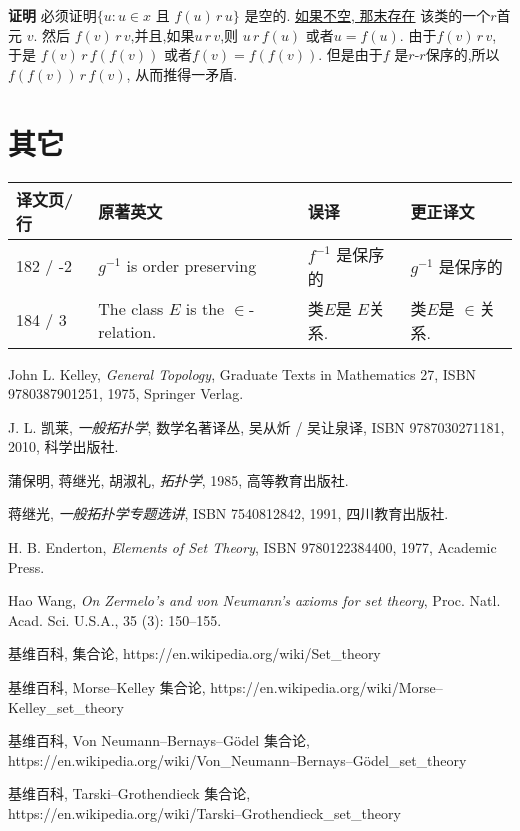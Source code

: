 \documentclass[zihao=-4,a4paper]{ctexart}
\begin{document}
{\bf 证明}
必须证明$\{u: u \in x $ 且 $ f(u) \, r\, u\}$ 是空的. 
\underline{如果不空, 那末存在}\! 该类的一个$r$首元 $v$.
然后 $f(v)\, r\, v $,并且,如果$u\, r\, v$,则 $u\, r\, f(u)$
或者$u = f(u)$.
由于$f(v)\, r\, v$, 于是
\underline{$f(v)\, r\, f(f(v))$}
或者$f(v)=f(f(v))$. 但是由于$f$ 是$r$-$r$保序的,所以
$f(f(v))\, r\, f(v)$, 从而推得一矛盾.


\section{其它}

\begin{tabular}{l l l l }
	\hline
	{\kaishu 译文页/行} & {\kaishu 原著英文} & {\kaishu 误译} & {\kaishu 更正译文} \\
	\hline
	182 / -2 & $g^{-1}$ is order preserving  & $f^{-1}$ 是保序的 & $g^{-1}$ 是保序的 \\
	184 / 3 & The class $E$ is the $\in$-relation. &类$E$是 $E$关系. & 类$E$是 $\in$关系. \\
	\hline
\end{tabular}






\begin{thebibliography}{9}
John L. Kelley,  \emph{General Topology}, Graduate Texts in Mathematics 27, ISBN 9780387901251, 1975, Springer Verlag.
	
J. L. 凯莱,  \emph{一般拓扑学}, 数学名著译丛, 吴从炘 / 吴让泉译, ISBN 9787030271181, 2010, 科学出版社.

蒲保明, 蒋继光, 胡淑礼, \emph{拓扑学}, 1985, 高等教育出版社.

蒋继光, \emph{一般拓扑学专题选讲}, ISBN 7540812842, 1991, 四川教育出版社.
	
H. B. Enderton, \emph{Elements of Set Theory}, ISBN 9780122384400, 1977, Academic Press.
	
Hao Wang, \emph{On Zermelo's and von Neumann's axioms for set theory}, Proc. Natl. Acad. Sci. U.S.A., 35 (3): 150–155.

基维百科, 集合论,	https://en.wikipedia.org/wiki/Set\_theory

基维百科, Morse–Kelley 集合论,	https://en.wikipedia.org/wiki/Morse–Kelley\_set\_theory

基维百科, Von Neumann–Bernays–Gödel  集合论,\\ https://en.wikipedia.org/wiki/Von\_Neumann–Bernays–Gödel\_set\_theory

基维百科, Tarski–Grothendieck  集合论,\\
https://en.wikipedia.org/wiki/Tarski–Grothendieck\_set\_theory

\end{thebibliography}
\end{document}
